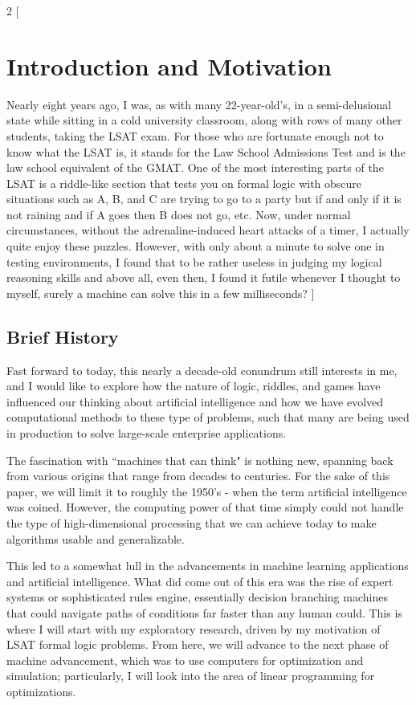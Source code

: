 \documentclass[a4paper,10pt]{extarticle}
\begin{document}
            \begin{multicols}{2}
            [
            \section{Introduction and Motivation}
            Nearly eight years ago, I was, as with many 22-year-old's, in a semi-delusional state while sitting in a cold university classroom, along with rows of many other students, taking the LSAT exam. For those who are fortunate enough not to know what the LSAT is, it stands for the Law School Admissions Test and is the law school equivalent of the GMAT. One of the most interesting parts of the LSAT is a riddle-like section that tests you on formal logic with obscure situations such as A, B, and C are trying to go to a party but if and only if it is not raining and if A goes then B does not go, etc. Now, under normal circumstances, without the adrenaline-induced heart attacks of a timer, I actually quite enjoy these puzzles. However, with only about a minute to solve one in testing environments, I found that to be rather useless in judging my logical reasoning skills and above all, even then, I found it futile whenever I thought to myself, surely a machine can solve this in a few milliseconds?
            ]

            \subsection{Brief History}
            Fast forward to today, this nearly a decade-old conundrum still interests in me, and I would like to explore how the nature of logic, riddles, and games have influenced our thinking about artificial intelligence and how we have evolved computational methods to these type of problems, such that many are being used in production to solve large-scale enterprise applications. 

            The fascination with ``machines that can think" is nothing new, spanning back from various origins that range from decades to centuries. For the sake of this paper, we will limit it to roughly the 1950's - when the term artificial intelligence was coined. However, the computing power of that time simply could not handle the type of high-dimensional processing that we can achieve today to make algorithms usable and generalizable. 

            This led to a somewhat lull in the advancements in machine learning applications and artificial intelligence. What did come out of this era was the rise of expert systems or sophisticated rules engine, essentially decision branching machines that could navigate paths of conditions far faster than any human could. This is where I will start with my exploratory research, driven by my motivation of LSAT formal logic problems. From here, we will advance to the next phase of machine advancement, which was to use computers for optimization and simulation; particularly, I will look into the area of linear programming for optimizations. 


\end{multicols}
\end{document}
